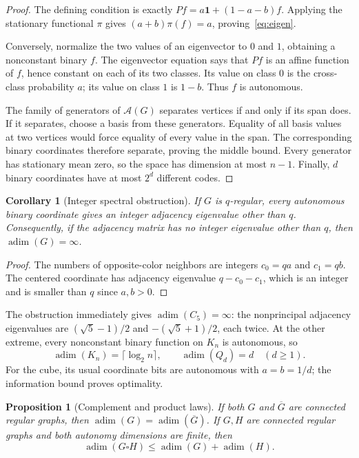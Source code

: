 \documentclass[11pt]{article}
\newtheorem{proposition}[theorem]{Proposition}
\newtheorem{corollary}[theorem]{Corollary}
\theoremstyle{definition}
\newcommand{\adim}{\operatorname{adim}}
\newcommand{\one}{\mathbf 1}
\newcommand{\Aut}{\mathcal A}
\numberwithin{equation}{section}
\begin{document}
\begin{proof}
The defining condition is exactly
$Pf=a\one+(1-a-b)f$. Applying the stationary functional $\pi$ gives
$(a+b)\pi(f)=a$, proving~\eqref{eq:eigen}.

Conversely, normalize the two values of an eigenvector to $0$ and $1$,
obtaining a nonconstant binary $f$. The eigenvector equation says that
$Pf$ is an affine function of $f$, hence constant on each of its two
classes. Its value on class $0$ is the cross-class probability $a$; its
value on class $1$ is $1-b$. Thus $f$ is autonomous.

The family of generators of $\Aut(G)$ separates vertices if and only if
its span does. If it separates, choose a basis from these generators.
Equality of all basis values at two vertices would force equality of
every value in the span. The corresponding binary coordinates therefore
separate, proving the middle bound. Every generator has stationary mean
zero, so the space has dimension at most $n-1$. Finally, $d$ binary
coordinates have at most $2^d$ different codes.
\end{proof}

\begin{corollary}[Integer spectral obstruction]\label{cor:integer}
If $G$ is $q$-regular, every autonomous binary coordinate gives an integer
adjacency eigenvalue other than $q$. Consequently, if the adjacency matrix
has no integer eigenvalue other than $q$, then $\adim(G)=\infty$.
\end{corollary}

\begin{proof}
The numbers of opposite-color neighbors are integers $c_0=qa$ and
$c_1=qb$. The centered coordinate has adjacency eigenvalue
$q-c_0-c_1$, which is an integer and is smaller than $q$ since $a,b>0$.
\end{proof}

The obstruction immediately gives $\adim(C_5)=\infty$: the nonprincipal
adjacency eigenvalues are $(\sqrt5-1)/2$ and $-(\sqrt5+1)/2$, each twice.
At the other extreme, every nonconstant binary function on $K_n$ is
autonomous, so
\begin{equation}\label{eq:basic}
 \adim(K_n)=\lceil\log_2 n\rceil,\qquad \adim(Q_d)=d\quad(d\geq1).
\end{equation}
For the cube, its usual coordinate bits are autonomous with $a=b=1/d$;
the information bound proves optimality.

\begin{proposition}[Complement and product laws]\label{prop:operations}
If both $G$ and $\overline G$ are connected regular graphs, then
$\adim(G)=\adim(\overline G)$. If $G,H$ are connected regular graphs and
both autonomy dimensions are finite, then
\[
 \adim(G\square H)\leq\adim(G)+\adim(H).
\]
\end{proposition}
\end{document}
